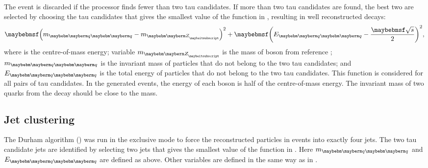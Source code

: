 The event is discarded if the \BonoTauFinder processor finds fewer than two tau candidates. If more than two tau candidates are found, the best two are selected by choosing the tau candidates that gives the smallest value of the function in , resulting in well reconstructed \ZToqq decays:
\begin{equation}
{\parenths{m_{\Pquark\Pquark} - m_{\PZ}}^2}+ {\parenths{E_{\Pquark\Pquark} - \frac{\sqrtS}{2}}^2},
\label{eq:tauMinimiser}
\end{equation}
where \sqrtS is the centre-of-mass energy;   variable $m_{\PZ}$ is the mass of \PZ boson from reference \cite{Agashe:2014kda};  $m_{\Pquark\Pquark}$ is the invariant mass of particles that do not belong to the two tau candidates; and  $E_{\Pquark\Pquark}$ is  the total energy of particles that do not belong to the two tau candidates. This function is considered for all pairs of tau candidates.  In the generated \eeZZQQ events, the energy of each \PZ boson is half of the centre-of-mass energy. The invariant mass of two quarks from the \PZ decay should be close to the \PZ mass.







\subsection{Jet clustering}


The Durham algorithm  () was run in the exclusive mode to force the reconstructed particles in \eeZZQQ events into exactly four jets. The two tau candidate jets are identified by selecting two jets that gives the smallest value of the  function in . Here $m_{\Pquark\Pquark}$ and $E_{\Pquark\Pquark}$  are defined as above. Other variables are defined in the same way as in .



